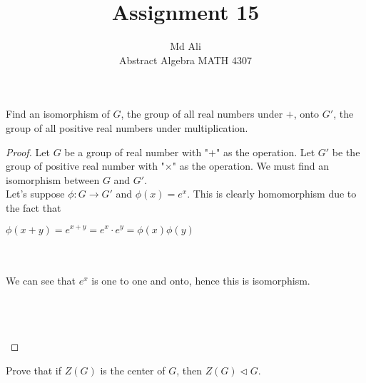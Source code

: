 \documentclass[12pt]{article}
\newenvironment{problem}[2][Problem]{\begin{trivlist}
\item[\hskip \labelsep {\bfseries #1}\hskip \labelsep {\bfseries #2.}]}{\end{trivlist}}
\begin{document}
 
 
\title{Assignment 15}%
\author{Md Ali\\ %
Abstract Algebra MATH 4307} %
 
\maketitle
 
\begin{problem}{2.5.8} %
Find an isomorphism of $G$, the group of all real numbers under $+$, onto $G'$, the group of all positive real numbers under multiplication. 
\end{problem}
 
\begin{proof}
Let $G$ be a group of real number with "$+$" as the operation. Let $G'$ be the group of positive real number with "$\times$" as the operation. We must find an isomorphism between $G$ and $G'$. \\ 

Let's suppose $\phi : G \rightarrow G'$ and $\phi (x) = e ^{x}$. This is clearly homomorphism due to the fact that \\
\centerline{$\phi (x+y) = e^{x+y} =e^x \cdot e^y = \phi (x) \phi (y)$} \\ \\
We can see that $e^{x}$ is one to one and onto, hence this is isomorphism. \\ \\
\centerline{} \\ \\

\end{proof}

\begin{problem}{2.5.12}
Prove that if $Z(G)$ is the center of $G$, then $Z(G) \triangleleft G$. \\ 
\end{problem}
\end{document}
